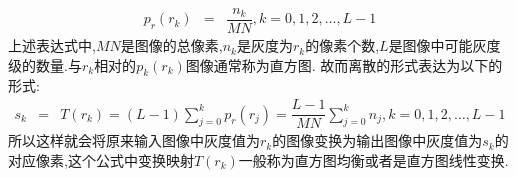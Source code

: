 \documentclass[UTF8,a4paper,10pt]{ctexart}
\begin{document}
\begin{flushleft}
        \begin{eqnarray}
            p_{r}(r_{k})&=&\dfrac{n_{k}}{MN},k=0,1,2,\dots,L-1\nonumber
        \end{eqnarray}
        上述表达式中,$MN$是图像的总像素,$n_{k}$是灰度为$r_{k}$的像素个数,$L$是图像中可能灰度级的数量.与$r_{k}$相对的$p_{k}(r_{k})$图像通常称为直方图.
        故而离散的形式表达为以下的形式:
        \begin{eqnarray}
            s_{k}&=&T(r_{k})=(L-1)\sum\limits_{j=0}^{k}p_{r}(r_{j})=\dfrac{L-1}{MN}\sum\limits_{j=0}^{k}n_{j},k=0,1,2,\dots,L-1\nonumber
        \end{eqnarray}
        所以这样就会将原来输入图像中灰度值为$r_{k}$的图像变换为输出图像中灰度值为$s_{k}$的对应像素,这个公式中变换映射$T(r_{k})$一般称为直方图均衡或者是直方图线性变换.\\


\end{flushleft}
\end{document}

